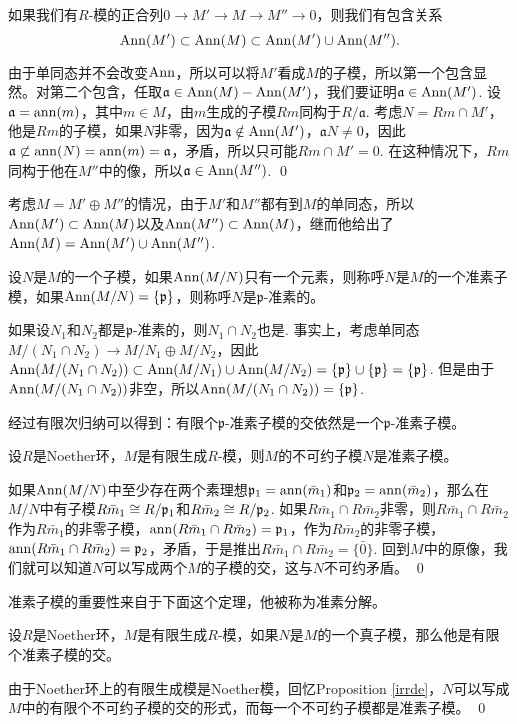 \pro 如果我们有$R$-模的正合列$0\to M'\to M\to M''\to 0$，则我们有包含关系
\[
	\operatorname{Ann}(M')\subset \operatorname{Ann}(M)\subset \operatorname{Ann}(M')\cup \operatorname{Ann}(M'').
\]

\proof
	由于单同态并不会改变$\operatorname{Ann}$，所以可以将$M'$看成$M$的子模，所以第一个包含显然。对第二个包含，任取$\mathfrak{a}\in \operatorname{Ann}(M)-\operatorname{Ann}(M')$，我们要证明$\mathfrak{a}\in \operatorname{Ann}(M')$. 设$\mathfrak{a}=\operatorname{ann}(m)$，其中$m\in M$，由$m$生成的子模$Rm$同构于$R/\mathfrak{a}$. 考虑$N=Rm\cap M'$，他是$Rm$的子模，如果$N$非零，因为$\mathfrak{a}\notin \operatorname{Ann}(M')$，$\mathfrak{a}N\neq 0$，因此$\mathfrak{a}\not\subset \operatorname{ann}(N)=\operatorname{ann}(m)=\mathfrak{a}$，矛盾，所以只可能$Rm\cap M'=0$. 在这种情况下，$Rm$同构于他在$M''$中的像，所以$\mathfrak{a}\in \operatorname{Ann}(M'')$.
\qed

考虑$M=M'\oplus M''$的情况，由于$M'$和$M''$都有到$M$的单同态，所以$\operatorname{Ann}(M')\subset \operatorname{Ann}(M)$以及$\operatorname{Ann}(M'')\subset \operatorname{Ann}(M)$，继而他给出了$\operatorname{Ann}(M)=\operatorname{Ann}(M')\cup \operatorname{Ann}(M'')$.

\para 设$N$是$M$的一个子模，如果$\operatorname{Ann}(M/N)$只有一个元素，则称呼$N$是$M$的一个准素子模，如果$\operatorname{Ann}(M/N)=\{\mathfrak{p}\}$，则称呼$N$是$\mathfrak{p}$-准素的。

如果设$N_1$和$N_2$都是$\mathfrak{p}$-准素的，则$N_1\cap N_2$也是. 事实上，考虑单同态$M/(N_1\cap N_2)\to M/N_1\oplus M/N_2$，因此$\operatorname{Ann}(M/(N_1\cap N_2))\subset \operatorname{Ann}(M/N_1)\cup \operatorname{Ann}(M/N_2)=\{\mathfrak{p}\}\cup \{\mathfrak{p}\}=\{\mathfrak{p}\}$. 但是由于$\operatorname{Ann}(M/(N_1\cap N_2))$非空，所以$\operatorname{Ann}(M/(N_1\cap N_2))=\{\mathfrak{p}\}$.

经过有限次归纳可以得到：有限个$\mathfrak{p}$-准素子模的交依然是一个$\mathfrak{p}$-准素子模。

\lem 设$R$是Noether环，$M$是有限生成$R$-模，则$M$的不可约子模$N$是准素子模。

\proof
	如果$\operatorname{Ann}(M/N)$中至少存在两个素理想$\mathfrak{p}_1=\operatorname{ann}(\bar{m}_1)$和$\mathfrak{p}_2=\operatorname{ann}(\bar{m}_2)$，那么在$M/N$中有子模$R\bar{m}_1\cong R/\mathfrak{p}_1$和$R\bar{m}_2\cong R/\mathfrak{p}_2$. 如果$R\bar{m}_1\cap R\bar{m}_2$非零，则$R\bar{m}_1\cap R\bar{m}_2$作为$R\bar{m}_1$的非零子模，$\operatorname{ann}(R\bar{m}_1\cap R\bar{m}_2)=\mathfrak{p}_1$，作为$R\bar{m}_2$的非零子模，$\operatorname{ann}(R\bar{m}_1\cap R\bar{m}_2)=\mathfrak{p}_2$，矛盾，于是推出$R\bar{m}_1\cap R\bar{m}_2=\{\bar{0}\}$. 回到$M$中的原像，我们就可以知道$N$可以写成两个$M$的子模的交，这与$N$不可约矛盾。
\qed

准素子模的重要性来自于下面这个定理，他被称为准素分解。

\theo 设$R$是Noether环，$M$是有限生成$R$-模，如果$N$是$M$的一个真子模，那么他是有限个准素子模的交。

\proof
	由于Noether环上的有限生成模是Noether模，回忆Proposition \eqref{irrde}，$N$可以写成$M$中的有限个不可约子模的交的形式，而每一个不可约子模都是准素子模。
\qed


